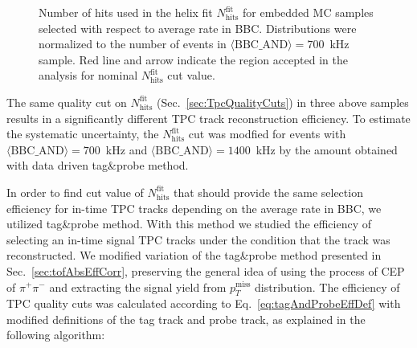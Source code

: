 \begin{figure}[H]
\begin{minipage}{.4725\textwidth}
		\caption[$\chi^{2}/\text{NDF}$ obtained in the search for the best $N_{\text{hits}}^{\text{fit}}$ cut value.]
		{Number of hits used in the helix fit $N_{\text{hits}}^{\text{fit}}$ for embedded MC samples  selected with respect to average rate in BBC. Distributions were normalized to the number of events in \mbox{$\langle\text{BBC\_AND}\rangle=700$~kHz} sample. Red line and arrow indicate the region accepted in the analysis for nominal $N_{\text{hits}}^{\text{fit}}$ cut value.}\label{fig:NhitsFitPileUp}%
	\end{minipage}%
\end{figure}\vspace{-10pt}%

The same quality cut on $N_{\text{hits}}^{\text{fit}}$ (Sec.~\ref{sec:TpcQualityCuts}) in three above samples results in a significantly different TPC track reconstruction efficiency. To estimate the systematic uncertainty, the $N_{\text{hits}}^{\text{fit}}$ cut was modfied for events with \mbox{$\langle\text{BBC\_AND}\rangle=700$~kHz} and \mbox{$\langle\text{BBC\_AND}\rangle=1400$~kHz} by the amount obtained with data driven tag\&probe method.


In order to find cut value of $N_{\text{hits}}^{\text{fit}}$ that should provide the same selection efficiency for in-time TPC tracks depending on the average rate in BBC, we utilized tag\&probe method. With this method we studied the efficiency of selecting an in-time signal TPC tracks under the condition that the track was reconstructed. We modified variation of the tag\&probe method presented in Sec.~\ref{sec:tofAbsEffCorr}, preserving the general idea of using the process of CEP of $\pi^{+}\pi^{-}$ and extracting the signal yield from $p_{T}^{\text{miss}}$ distribution. The efficiency of TPC quality cuts was calculated according to Eq.~\eqref{eq:tagAndProbeEffDef} with modified definitions of the tag track and probe track, as explained in the following algorithm:

